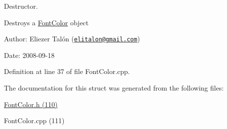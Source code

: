 Destructor. 

Destroys a \hyperlink{struct_font_color}{FontColor} object

\begin{Desc}
\item[Author:]Eliezer Talón (\href{mailto:elitalon@gmail.com}{\tt elitalon@gmail.com}) \end{Desc}
\begin{Desc}
\item[Date:]2008-09-18 \end{Desc}


Definition at line 37 of file FontColor.cpp.

The documentation for this struct was generated from the following files:\begin{CompactItemize}
\item 
\hyperlink{_font_color_8h}{FontColor.h (110)}\item 
FontColor.cpp (111)\end{CompactItemize}
